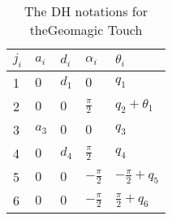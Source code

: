 \begin{table}[H]
\centering
\begin{tabular}{|l|l|l|l|l|}
\hline
 $j_i$ 	  & $a_i$    & $d_i$ & $\alpha_i$ 		 & $\theta_i$ 			 	\\ \hline
 1  	  &  $0$     & $d_1$ & $0$	 			 & $q_1$ 			    	 \\ \hline
 2  	  &  $0$     & $0$ 	 & $\frac{\pi}{2}$ 	 & $q_2 + \theta_1$ 		 \\ \hline
 3  	  &  $a_3$	 & $0$   & $0$ 		 		 & $q_3$ 					  \\ \hline
 4  	  &  $0$	 & $d_4$ & $\frac{\pi}{2}$ 	 & $q_4$ 			 		  \\ \hline
 5  	  &  $0$	 & $0$   & $-\frac{\pi}{2}$  & $-\frac{\pi}{2} + q_5$	 \\ \hline
 6  	  &  $0$	 & $0$   & $-\frac{\pi}{2}$  & $\frac{\pi}{2}+q_6$ 		 \\ \hline
\end{tabular}
\hspace{2cm}\caption{The DH notations for the\newline Geomagic Touch}
\label{tab:kin_geo}
\end{table}






